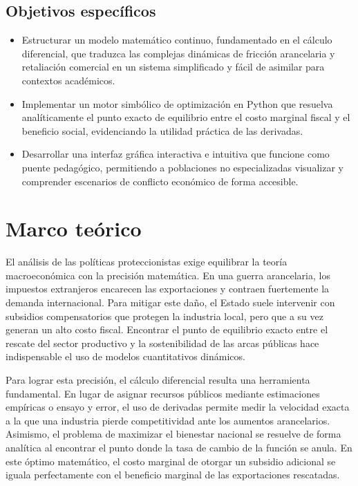 \documentclass[12pt, a4paper]{article}
\begin{document}
\subsection{Objetivos específicos}
\begin{itemize}
    \item Estructurar un modelo matemático continuo, fundamentado en el cálculo diferencial, que traduzca las complejas dinámicas de fricción arancelaria y retaliación comercial en un sistema simplificado y fácil de asimilar para contextos académicos.
    \item Implementar un motor simbólico de optimización en Python que resuelva analíticamente el punto exacto de equilibrio entre el costo marginal fiscal y el beneficio social, evidenciando la utilidad práctica de las derivadas.
    \item Desarrollar una interfaz gráfica interactiva e intuitiva que funcione como puente pedagógico, permitiendo a poblaciones no especializadas visualizar y comprender escenarios de conflicto económico de forma accesible.
\end{itemize}

\section{Marco teórico}

El análisis de las políticas proteccionistas exige equilibrar la teoría macroeconómica con la precisión matemática. En una guerra arancelaria, los impuestos extranjeros encarecen las exportaciones y contraen fuertemente la demanda internacional. Para mitigar este daño, el Estado suele intervenir con subsidios compensatorios que protegen la industria local, pero que a su vez generan un alto costo fiscal. Encontrar el punto de equilibrio exacto entre el rescate del sector productivo y la sostenibilidad de las arcas públicas hace indispensable el uso de modelos cuantitativos dinámicos.

Para lograr esta precisión, el cálculo diferencial resulta una herramienta fundamental. En lugar de asignar recursos públicos mediante estimaciones empíricas o ensayo y error, el uso de derivadas permite medir la velocidad exacta a la que una industria pierde competitividad ante los aumentos arancelarios. Asimismo, el problema de maximizar el bienestar nacional se resuelve de forma analítica al encontrar el punto donde la tasa de cambio de la función se anula. En este óptimo matemático, el costo marginal de otorgar un subsidio adicional se iguala perfectamente con el beneficio marginal de las exportaciones rescatadas.
\end{document}
